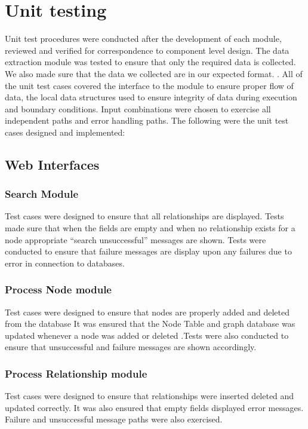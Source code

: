 \section{Unit testing}
Unit test procedures were conducted after the development of each module, reviewed and verified for correspondence to component level design. The data extraction module was tested to ensure that only the required data is collected. We also made sure that the data we collected are in our expected format. . All of the unit test cases covered the interface to the module to ensure proper flow of data, the local data structures used to ensure integrity of data during execution and boundary conditions. Input combinations were chosen to exercise all independent paths and error handling paths. The following were the unit test cases designed and implemented:
\subsection{Web Interfaces}
\subsubsection{Search Module}
Test cases were designed to ensure that all relationships are displayed. Tests made sure that when the fields are empty and when no relationship exists for a node appropriate “search unsuccessful” messages are shown. Tests were conducted to ensure that failure messages are display upon any failures due to error in connection to databases.
\subsubsection{Process Node module}
Test cases were designed to ensure that nodes are properly added and deleted from the database It was ensured that the Node Table and graph database was updated whenever a node was added or deleted .Tests were also conducted to ensure that unsuccessful and failure messages are shown accordingly.
\subsubsection{Process Relationship module}
Test cases were designed to ensure that relationships were inserted deleted and updated correctly. It was also ensured that empty fields displayed error messages. Failure and unsuccessful message paths were also exercised.

